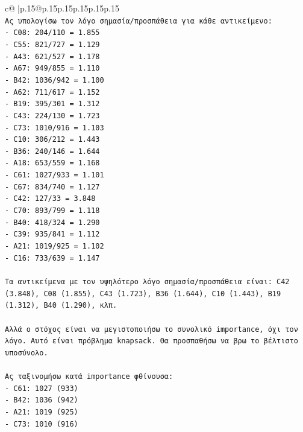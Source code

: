 \documentclass{article}
\begin{document}
{\begin{supertabular}{c@{$\;$}|p{.15\linewidth}@{}p{.15\linewidth}p{.15\linewidth}p{.15\linewidth}p{.15\linewidth}p{.15\linewidth}}
{{{\\ 
\texttt{Ας υπολογίσω τον λόγο σημασία/προσπάθεια για κάθε αντικείμενο:} \\
\texttt{{-} C08: 204/110 = 1.855} \\
\texttt{{-} C55: 821/727 = 1.129} \\
\texttt{{-} A43: 621/527 = 1.178} \\
\texttt{{-} A67: 949/855 = 1.110} \\
\texttt{{-} B42: 1036/942 = 1.100} \\
\texttt{{-} A62: 711/617 = 1.152} \\
\texttt{{-} B19: 395/301 = 1.312} \\
\texttt{{-} C43: 224/130 = 1.723} \\
\texttt{{-} C73: 1010/916 = 1.103} \\
\texttt{{-} C10: 306/212 = 1.443} \\
\texttt{{-} B36: 240/146 = 1.644} \\
\texttt{{-} A18: 653/559 = 1.168} \\
\texttt{{-} C61: 1027/933 = 1.101} \\
\texttt{{-} C67: 834/740 = 1.127} \\
\texttt{{-} C42: 127/33 = 3.848} \\
\texttt{{-} C70: 893/799 = 1.118} \\
\texttt{{-} B40: 418/324 = 1.290} \\
\texttt{{-} C39: 935/841 = 1.112} \\
\texttt{{-} A21: 1019/925 = 1.102} \\
\texttt{{-} C16: 733/639 = 1.147} \\
\\ 
\texttt{Τα αντικείμενα με τον υψηλότερο λόγο σημασία/προσπάθεια είναι: C42 (3.848), C08 (1.855), C43 (1.723), B36 (1.644), C10 (1.443), B19 (1.312), B40 (1.290), κλπ.} \\
\\ 
\texttt{Αλλά ο στόχος είναι να μεγιστοποιήσω το συνολικό importance, όχι τον λόγο. Αυτό είναι πρόβλημα knapsack. Θα προσπαθήσω να βρω το βέλτιστο υποσύνολο.} \\
\\ 
\texttt{Ας ταξινομήσω κατά importance φθίνουσα:} \\
\texttt{{-} C61: 1027 (933)} \\
\texttt{{-} B42: 1036 (942)} \\
\texttt{{-} A21: 1019 (925)} \\
\texttt{{-} C73: 1010 (916)} \\
}}}
\end{supertabular}}
\end{document}
